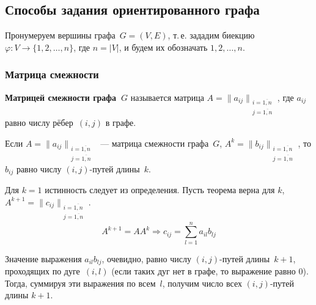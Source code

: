 \subsection{Способы задания ориентированного графа}
Пронумеруем вершины графа~$G = (V, E)$, т.\,е. зададим биекцию $\varphi \colon V \to \{ 1, 2, \ldots, n \}$, где $n = |V|$, и будем их обозначать $1, 2, \ldots, n$.

\subsubsection{Матрица смежности}
 \textbf{Матрицей смежности графа~$G$} называется матрица $A = \|a_{ij}\|_{\begin{smallmatrix}
i = \overline{1,n} \\
j = \overline{1,n}
\end{smallmatrix}}$, где $a_{ij}$ равно числу рёбер~$(i, j)$ в графе.

\begin{theorem}
Если $A = \|a_{ij}\|_{\begin{smallmatrix}
i = \overline{1,n} \\
j = \overline{1,n}
\end{smallmatrix}}$~--- матрица смежности графа~$G$,
$A^k = \|b_{ij}\|_{\begin{smallmatrix}
i = \overline{1,n} \\
j = \overline{1,n}
\end{smallmatrix}}$, то $b_{ij}$ равно числу $(i, j)$-путей длины~$k$.
\end{theorem}
\begin{proofmathind}
	\indbase Для $k = 1$ истинность следует из определения.
	\indstep Пусть теорема верна для $k$, $A^{k+1} = \|c_{ij}\|_{\begin{smallmatrix}
	i = \overline{1,n} \\
	j = \overline{1,n}
	\end{smallmatrix}}$.
	\begin{equation*}
	A^{k+1} = A A^k \Rightarrow c_{ij} = \sum_{l=1}^n a_{il} b_{lj}
	\end{equation*}
	
	Значение выражения $a_{il} b_{lj}$, очевидно, равно числу $(i, j)$-путей длины~$k + 1$, проходящих по дуге~$(i, l)$ (если таких дуг нет в графе, то выражение равно $0$).
	Тогда, суммируя эти выражения по всем~$l$, получим число всех $(i, j)$-путей длины $k + 1$. \indend
\end{proofmathind}

